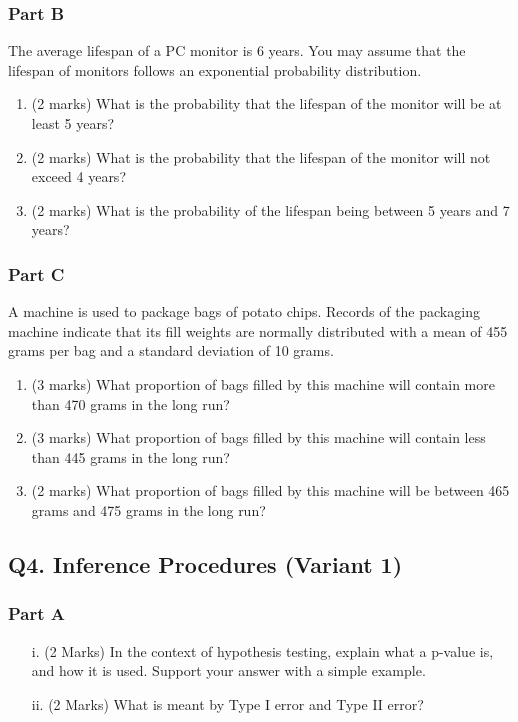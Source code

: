 \documentclass[a4paper,12pt]{article}
\begin{document}
\subsubsection*{Part B} %
The average lifespan of a PC monitor is 6 years. You may assume that the lifespan of monitors follows an exponential probability distribution.
    \begin{enumerate}
    \item (2 marks) What is the probability that the lifespan of the monitor will be at least 5 years?
    \item (2 marks) What is the probability that the lifespan of the monitor will not exceed 4 years?
    \item (2 marks) What is the probability of the lifespan being between 5 years and 7 years?
    \end{enumerate}

\subsubsection*{Part C} %
A machine is used to package bags of potato chips.  Records of the packaging machine indicate that its fill weights are normally distributed with a mean of 455 grams per bag and a standard deviation of 10 grams.

    \begin{enumerate}
    \item (3 marks) What proportion of bags filled by this machine will contain more than 470 grams in the long run?
    \item (3 marks)	What proportion of bags filled by this machine will contain less than 445 grams in the long run?
    \item (2 marks)	What proportion of bags filled by this machine will be between 465 grams and 475 grams in the long run?
    \end{enumerate}
\newpage


\subsection*{Q4. Inference Procedures (Variant 1)}

\subsubsection*{Part A} %
\begin{itemize}
\item[i.](2 Marks) In the context of hypothesis testing, explain what a p-value is, and how it is used. Support your answer with a simple example.
\item[ii.](2 Marks) What is meant by Type I error and Type II error?
\end{itemize}
\end{document}
